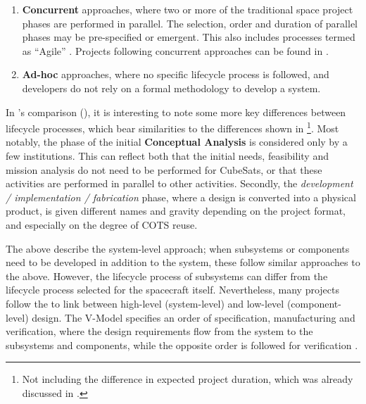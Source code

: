 \documentclass[a4paper,nobib,justified,final]{tufte-book}
\begin{document}
\begin{enumerate}[itemsep=-1ex]
	Nevertheless, the ``sequential'' specifier for this approaches implies that no two phases are performed in parallel.
	\item \textbf{Concurrent} approaches, where two or more of the traditional space project phases are performed in parallel. The selection, order and duration of parallel phases may be pre-specified or emergent. This also includes processes termed as ``Agile'' \autocite{honore-livermoreAgileSystemsEngineering2021}. Projects following concurrent approaches can be found in \cite{coyleEECSatCubeSatDevelopment2020,honore-livermoreIntegratingAgileSystems2022,schummerApproachSystemAnalysis2022}.

	\item \textbf{Ad-hoc} approaches, where no specific lifecycle process is followed, and developers do not rely on a formal methodology to develop a system.
\end{enumerate}

In \citeauthor{sousaCubeSatDevelopmentFramework2021}'s comparison (), it is interesting to note some more key differences between lifecycle processes, which bear similarities to the differences shown in \footnote{Not including the difference in expected project duration, which was already discussed in .}. Most notably, the phase of the initial \textbf{Conceptual Analysis} is considered only by a few institutions. This can reflect both that the initial needs, feasibility and mission analysis do not need to be performed for CubeSats, or that these activities are performed in parallel to other activities. Secondly, the \emph{development / implementation / fabrication} phase, where a design is converted into a physical product, is given different names and gravity depending on the project format, and especially on the degree of \acs{COTS} reuse.

The above describe the system-level approach; when subsystems or components need to be developed in addition to the system, these follow similar approaches to the above. However, the lifecycle process of subsystems can differ from the lifecycle process selected for the spacecraft itself. Nevertheless, many projects follow the  to link between high-level (system-level) and low-level (component-level) design. The V-Model specifies an order of specification, manufacturing and verification, where the design requirements flow from the system to the subsystems and components, while the opposite order is followed for verification \autocite{bundesrepublikdeutschlandVModellXT2006}.
\end{document}
